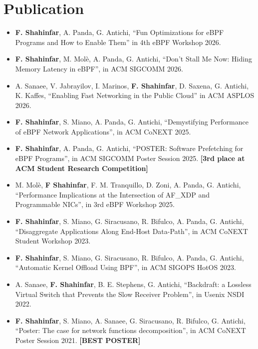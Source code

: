 \section {Publication}
\begin{itemize}
    \small
  \item \textbf{F. Shahinfar}, A. Panda, G. Antichi, ``Fun Optimizations for eBPF Programs and How to Enable Them'' in 4th eBPF Workshop 2026.
  \item \textbf{F. Shahinfar}, M. Molè, A. Panda, G. Antichi, ``Don't Stall Me Now: Hiding Memory Latency in eBPF'', in ACM SIGCOMM 2026.
  \item A. Sanaee, V. Jabrayilov, I. Marinos, \textbf{F. Shahinfar}, D. Saxena, G. Antichi, K. Kaffes,
    ``Enabling Fast Networking in the Public Cloud'' in ACM ASPLOS 2026.
  \item \textbf{F. Shahinfar}, S. Miano, A. Panda, G. Antichi,
    ``Demystifying Performance of eBPF Network Applications'',
    in ACM CoNEXT 2025.
  \item \textbf{F. Shahinfar}, A. Panda, G. Antichi,
    ``POSTER: Software Prefetching for eBPF Programs'',
    in ACM SIGCOMM Poster Session 2025. \textbf{[3rd place at ACM Student Research Competition]}
  \item M. Molè, \textbf{F Shahinfar}, F. M. Tranquillo, D. Zoni, A. Panda, G. Antichi,
    ``Performance Implications at the Intersection of AF\_XDP and Programmable NICs'',
    in 3rd eBPF Workshop 2025.
  \item \textbf{F. Shahinfar}, S. Miano, G. Siracusano, R. Bifulco, A. Panda, G. Antichi,
    ``Disaggregate Applications Along End-Host Data-Path'',
    in ACM CoNEXT Student Workshop 2023.
  \item \textbf{F. Shahinfar}, S. Miano, G. Siracusano, R. Bifulco, A. Panda, G. Antichi, ``Automatic Kernel Offload Using BPF'', in ACM SIGOPS HotOS 2023.
  \item A. Sanaee, \textbf{F. Shahinfar}, B. E. Stephens, G. Antichi, ``Backdraft: a Lossless Virtual Switch that
    Prevents the Slow Receiver Problem'', in Usenix NSDI 2022.
  \item \textbf{F. Shahinfar}, S. Miano, A. Sanaee, G. Siracusano, R. Bifulco, G. Antichi,
    ``Poster: The case for network functions decomposition'', in ACM CoNEXT Poster Session 2021. \textbf{[BEST POSTER]}
\end{itemize}

